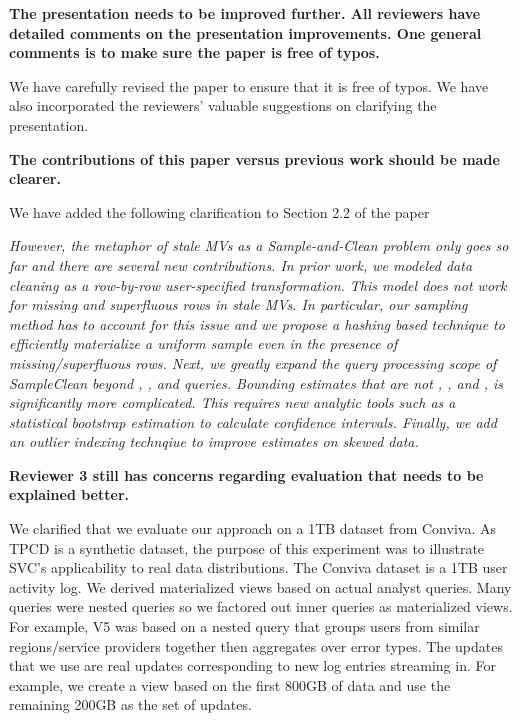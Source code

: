 \vspace{1.5em}

\textbf{The presentation needs to be improved further. All reviewers have detailed comments on the presentation improvements. One general comments is to make sure the paper is free of typos.}

We have carefully revised the paper to ensure that it is free of typos. We have also incorporated the reviewers' valuable suggestions on clarifying the presentation.

\vspace{1.5em}

\textbf{The contributions of this paper versus previous work should be made clearer.}

We have added the following clarification to Section 2.2 of the paper

\emph{However, the metaphor of stale MVs as a Sample-and-Clean problem only goes so far and there are several new contributions. In prior work, we modeled data cleaning as a row-by-row user-specified transformation.
This model does not work for missing and superfluous rows in stale MVs. In particular, our sampling method has to account for this issue and we propose a hashing based technique to efficiently materialize a uniform sample even in the presence of missing/superfluous rows. Next, we greatly expand the query processing scope of SampleClean beyond \sumfunc, \countfunc, and \avgfunc queries. Bounding estimates that are not \sumfunc, \countfunc, and \avgfunc, is significantly more complicated. This requires new analytic tools such as a statistical bootstrap estimation to calculate confidence intervals. Finally, we add an outlier indexing technqiue to improve estimates on skewed data.}

\vspace{1.5em}

\textbf{Reviewer 3 still has concerns regarding evaluation that needs to be explained better.}

We clarified that we evaluate our approach on a 1TB dataset from Conviva. As TPCD is a synthetic dataset, the purpose of this experiment was to illustrate SVC’s applicability to real data distributions. The Conviva dataset is a 1TB user activity log. We derived materialized views based on actual analyst queries. Many queries were nested queries so we factored out inner queries as materialized views. For example, V5 was based on a nested query that groups users from similar regions/service providers together then aggregates over error types. The updates that we use are real updates corresponding to new log entries streaming in. For example, we create a view based on the first 800GB of data and use the remaining 200GB as the set of updates. 

